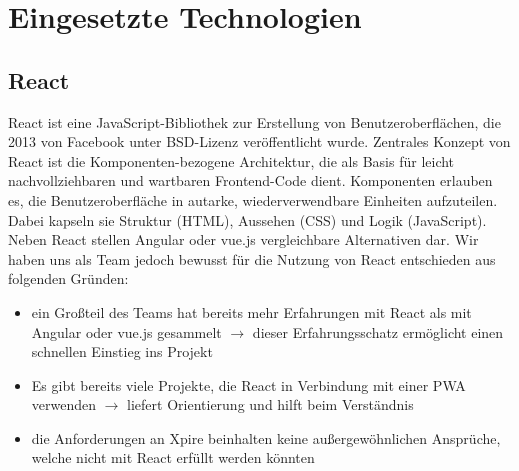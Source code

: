 \section{Eingesetzte Technologien}
\subsection{React}
React ist eine JavaScript-Bibliothek zur Erstellung von Benutzeroberflächen, die 2013 von Facebook unter BSD-Lizenz veröffentlicht wurde. Zentrales Konzept von React ist die Komponenten-bezogene Architektur, die als Basis für leicht nachvollziehbaren und wartbaren Frontend-Code dient. Komponenten erlauben es, die Benutzeroberfläche in autarke, wiederverwendbare Einheiten aufzuteilen. Dabei kapseln sie Struktur (HTML), Aussehen (CSS) und Logik (JavaScript).\autocite[vgl.][]{?}\\
Neben React stellen Angular oder vue.js vergleichbare Alternativen dar. Wir haben uns als Team jedoch bewusst für die Nutzung von React entschieden aus folgenden Gründen:
\begin{itemize}[noitemsep]
	\item ein Großteil des Teams hat bereits mehr Erfahrungen mit React als mit Angular oder vue.js gesammelt $\rightarrow$ dieser Erfahrungsschatz ermöglicht einen schnellen Einstieg ins Projekt
	\item Es gibt bereits viele Projekte, die React in Verbindung mit einer PWA verwenden $\rightarrow$ liefert Orientierung und hilft beim Verständnis	\item die Anforderungen an Xpire beinhalten keine außergewöhnlichen Ansprüche, welche nicht mit React erfüllt werden könnten
\end{itemize}

